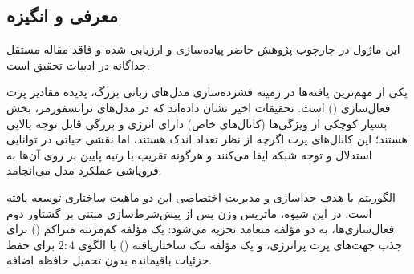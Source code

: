 \subsection{معرفی و انگیزه}
این ماژول در چارچوب پژوهش حاضر پیاده‌سازی و ارزیابی شده و فاقد مقاله مستقل جداگانه در ادبیات تحقیق است.

یکی از مهم‌ترین یافته‌ها در زمینه فشرده‌سازی مدل‌های زبانی بزرگ، پدیده مقادیر پرت فعال‌سازی () است. تحقیقات اخیر نشان داده‌اند که در مدل‌های ترانسفورمر، بخش بسیار کوچکی از ویژگی‌ها (کانال‌های خاص) دارای انرژی و بزرگی قابل توجه بالایی هستند؛ این کانال‌های پرت اگرچه از نظر تعداد اندک هستند، اما نقشی حیاتی در توانایی استدلال و توجه شبکه ایفا می‌کنند و هرگونه تقریب با رتبه پایین بر روی آن‌ها به فروپاشی عملکرد مدل می‌انجامد.

الگوریتم  با هدف جداسازی و مدیریت اختصاصی این دو ماهیت ساختاری توسعه یافته است. در این شیوه، ماتریس وزن پس از پیش‌شرط‌سازی مبتنی بر گشتاور دوم فعال‌سازی‌ها، به دو مؤلفه متعامد تجزیه می‌شود: یک مؤلفه کم‌مرتبه متراکم () برای جذب جهت‌های پرت پرانرژی، و یک مؤلفه تنک ساختاریافته () با الگوی $2:4$ برای حفظ جزئیات باقیمانده بدون تحمیل حافظه اضافه.
